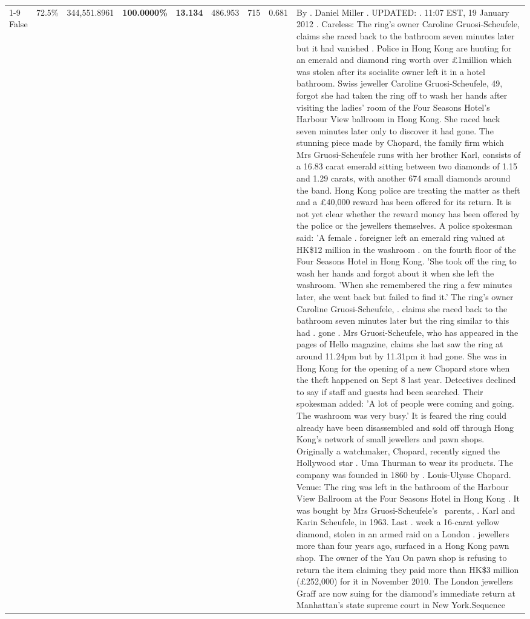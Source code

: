 \begin{table}[H]
\begin{tabular}{lllrlllll}
\cline{1-9}
False & 72.5\% & 344,551.8961 & \bfseries \color{red} 100.0000\% & \bfseries \color{red} 13.134 & 486.953 & 715 & 0.681 & By . Daniel Miller . UPDATED: . 11:07 EST, 19 January 2012 . Careless: The ring's owner Caroline Gruosi-Scheufele, claims she raced back to the bathroom seven minutes later but it had vanished . Police in Hong Kong are hunting for an emerald and diamond ring worth over £1million which was stolen after its socialite owner left it in a hotel bathroom. Swiss jeweller Caroline Gruosi-Scheufele, 49, forgot she had taken the ring off to wash her hands after visiting the ladies' room of the Four Seasons Hotel's Harbour View ballroom in Hong Kong. She raced back seven minutes later only to discover it had gone. The stunning piece made by Chopard, the family firm which Mrs Gruosi-Scheufele runs with her brother Karl, consists of a 16.83 carat emerald sitting between two diamonds of 1.15 and 1.29 carats, with another 674 small diamonds around the band. Hong Kong police are treating the matter as theft and a £40,000 reward has been offered for its return. It is not yet clear whether the reward money has been offered by the police or the jewellers themselves. A police spokesman said: 'A female . foreigner left an emerald ring valued at HK\$12 million in the washroom . on the fourth floor of the Four Seasons Hotel in Hong Kong. 'She took off the ring to wash her hands and forgot about it when she left the washroom. 'When she remembered the ring a few minutes later, she went back but failed to find it.' The ring's owner Caroline Gruosi-Scheufele, . claims she raced back to the bathroom seven minutes later but the ring similar to this had . gone . Mrs Gruosi-Scheufele, who has appeared in the pages of Hello magazine, claims she last saw the ring at around 11.24pm but by 11.31pm it had gone. She was in Hong Kong for the opening of a new Chopard store when the theft happened on Sept 8 last year. Detectives declined to say if staff and guests had been searched. Their spokesman added: 'A lot of people were coming and going. The washroom was very busy.' It is feared the ring could already have been disassembled and sold off through Hong Kong's network of small jewellers and pawn shops. Originally a watchmaker, Chopard, recently signed the Hollywood star . Uma Thurman to wear its products. The company was founded in 1860 by . Louis-Ulysse Chopard. Venue: The ring was left in the bathroom of the Harbour View Ballroom at the Four Seasons Hotel in Hong Kong . It was bought by Mrs Gruosi-Scheufele's  parents, . Karl and Karin Scheufele, in 1963. Last . week a 16-carat yellow diamond, stolen in an armed raid on a London . jewellers more than four years ago, surfaced in a Hong Kong pawn shop. The owner of the Yau On pawn shop is refusing to return the item claiming they paid more than HK\$3 million (£252,000) for it in November 2010. The London jewellers Graff are now suing for the diamond’s immediate return at Manhattan’s state supreme court in New York.Sequence \\

\end{tabular}
\end{table}
